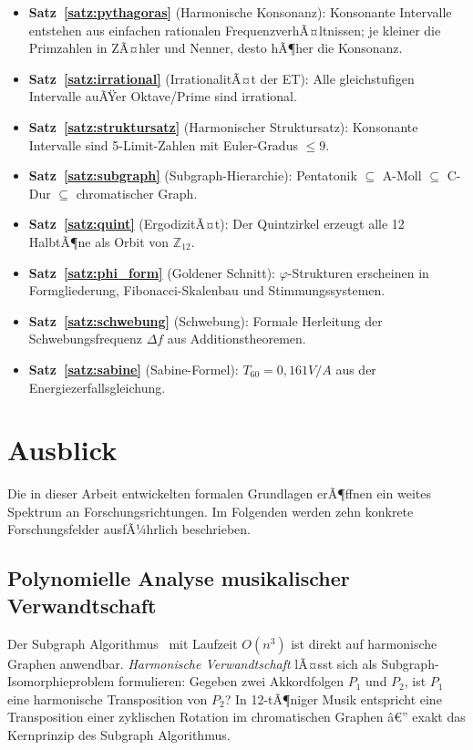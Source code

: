 ﻿\documentclass[a4paper,12pt]{article}
\theoremstyle{definition}
\begin{document}
\begin{itemize}
    \item \textbf{Satz~\ref{satz:pythagoras}} (Harmonische Konsonanz): Konsonante
          Intervalle entstehen aus einfachen rationalen FrequenzverhÃ¤ltnissen;
          je kleiner die Primzahlen in ZÃ¤hler und Nenner, desto hÃ¶her die Konsonanz.
    \item \textbf{Satz~\ref{satz:irrational}} (IrrationalitÃ¤t der ET): Alle
          gleichstufigen Intervalle auÃŸer Oktave/Prime sind irrational.
    \item \textbf{Satz~\ref{satz:struktursatz}} (Harmonischer Struktursatz):
          Konsonante Intervalle sind 5-Limit-Zahlen mit Euler-Gradus $\leq 9$.
    \item \textbf{Satz~\ref{satz:subgraph}} (Subgraph-Hierarchie): Pentatonik
          $\subseteq$ A-Moll $\subseteq$ C-Dur $\subseteq$ chromatischer Graph.
    \item \textbf{Satz~\ref{satz:quint}} (ErgodizitÃ¤t): Der Quintzirkel erzeugt
          alle 12 HalbtÃ¶ne als Orbit von $\mathbb{Z}_{12}$.
    \item \textbf{Satz~\ref{satz:phi_form}} (Goldener Schnitt): $\varphi$-Strukturen
          erscheinen in Formgliederung, Fibonacci-Skalenbau und Stimmungssystemen.
    \item \textbf{Satz~\ref{satz:schwebung}} (Schwebung): Formale Herleitung der
          Schwebungsfrequenz $\Delta f$ aus Additionstheoremen.
    \item \textbf{Satz~\ref{satz:sabine}} (Sabine-Formel): $T_{60} = 0{,}161 V/A$
          aus der Energiezerfallsgleichung.
\end{itemize}

\section{Ausblick}

Die in dieser Arbeit entwickelten formalen Grundlagen erÃ¶ffnen ein weites Spektrum
an Forschungsrichtungen. Im Folgenden werden zehn konkrete Forschungsfelder
ausfÃ¼hrlich beschrieben.

\subsection{Polynomielle Analyse musikalischer Verwandtschaft}

Der Subgraph Algorithmus~\cite{epp2026subgraph} mit Laufzeit $O(n^3)$ ist direkt
auf harmonische Graphen anwendbar. \emph{Harmonische Verwandtschaft} lÃ¤sst sich als
Subgraph-Isomorphieproblem formulieren: Gegeben zwei Akkordfolgen $P_1$ und $P_2$,
ist $P_1$ eine harmonische Transposition von $P_2$? In 12-tÃ¶niger Musik entspricht
eine Transposition einer zyklischen Rotation im chromatischen Graphen â€” exakt das
Kernprinzip des Subgraph Algorithmus.
\end{document}
